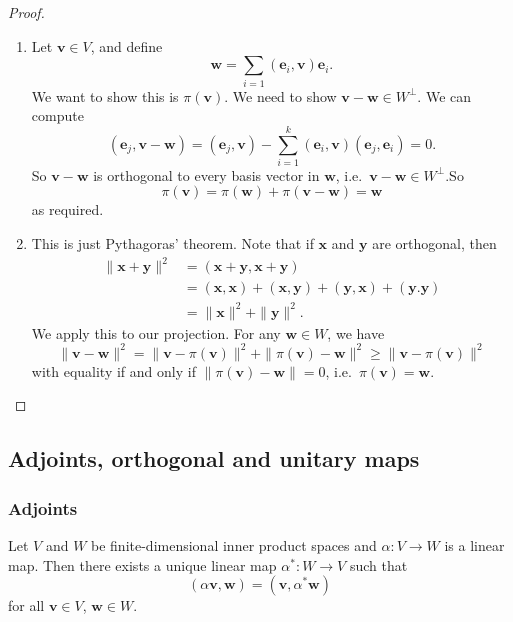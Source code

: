 \documentclass[a4paper]{article}
\begin{document}
\begin{proof}\leavevmode
  \begin{enumerate}
    \item Let $\mathbf{v} \in V$, and define
      \[
        \mathbf{w} = \sum_{i = 1} (\mathbf{e}_i, \mathbf{v}) \mathbf{e}_i.
      \]
      We want to show this is $\pi(\mathbf{v})$. We need to show $\mathbf{v} - \mathbf{w} \in W^\perp$. We can compute
      \[
        (\mathbf{e}_j, \mathbf{v} - \mathbf{w}) = (\mathbf{e}_j, \mathbf{v}) - \sum_{i = 1}^k (\mathbf{e}_i, \mathbf{v}) (\mathbf{e}_j, \mathbf{e}_i) = 0.
      \]
      So $\mathbf{v} - \mathbf{w}$ is orthogonal to every basis vector in $\mathbf{w}$, i.e.\ $\mathbf{v} - \mathbf{w} \in W^\perp$.So
      \[
        \pi(\mathbf{v}) = \pi(\mathbf{w}) + \pi(\mathbf{v} - \mathbf{w}) = \mathbf{w}
      \]
      as required.
    \item This is just Pythagoras' theorem. Note that if $\mathbf{x}$ and $\mathbf{y}$ are orthogonal, then
      \begin{align*}
        \|\mathbf{x} + \mathbf{y}\|^2 &= (\mathbf{x} + \mathbf{y}, \mathbf{x} + \mathbf{y}) \\
        &= (\mathbf{x}, \mathbf{x}) + (\mathbf{x}, \mathbf{y}) + (\mathbf{y}, \mathbf{x}) + (\mathbf{y}. \mathbf{y})\\
        &= \|\mathbf{x}\|^2 + \|\mathbf{y}\|^2.
      \end{align*}
      We apply this to our projection. For any $\mathbf{w} \in W$, we have
      \[
        \|\mathbf{v} - \mathbf{w}\|^2 = \|\mathbf{v} - \pi (\mathbf{v})\|^2 + \|\pi(\mathbf{v}) - \mathbf{w}\|^2 \geq \|\mathbf{v} - \pi(\mathbf{v})\|^2
      \]
      with equality if and only if $\|\pi(\mathbf{v}) - \mathbf{w}\| = 0$, i.e.\ $\pi(\mathbf{v}) = \mathbf{w}$.
  \end{enumerate}
\end{proof}

\subsection{Adjoints, orthogonal and unitary maps}
\subsubsection*{Adjoints}
\begin{lemma}
  Let $V$ and $W$ be finite-dimensional inner product spaces and $\alpha: V \to W$ is a linear map. Then there exists a unique linear map $\alpha^*: W \to V$ such that
  \[
    (\alpha \mathbf{v}, \mathbf{w}) = (\mathbf{v}, \alpha^* \mathbf{w})\tag{$*$}
  \]
  for all $\mathbf{v} \in V$, $\mathbf{w} \in W$.
\end{lemma}
\end{document}
